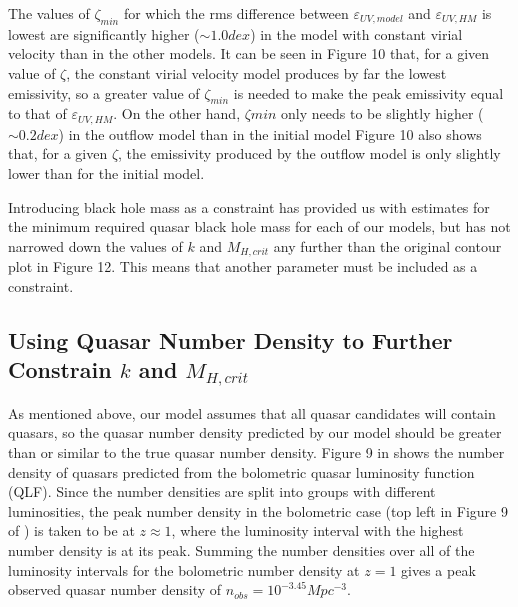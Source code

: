 \documentclass[12pt, twocolumn]{report}%
\begin{document}
The values of $\zeta_{min}$ for which the rms difference between $\varepsilon_{UV,model}$ and $\varepsilon_{UV,HM}$ is lowest are significantly higher ($\sim1.0dex$) in the model with constant virial velocity than in the other models. It can be seen in Figure 10 that, for a given value of $\zeta$, the constant virial velocity model produces by far the lowest emissivity, so a greater value of $\zeta_{min}$ is needed to make the peak emissivity equal to that of $\varepsilon_{UV,HM}$. On the other hand, $\zeta{min}$ only needs to be slightly higher ($\sim0.2dex$) in the outflow model than in the initial model Figure 10 also shows that, for a given $\zeta$, the emissivity produced by the outflow model is only slightly lower than for the initial model.\par

Introducing black hole mass as a constraint has provided us with estimates for the minimum required quasar black hole mass for each of our models, but has not narrowed down the values of $k$ and $M_{H,crit}$ any further than the original contour plot in Figure 12. This means that another parameter must be included as a constraint.

\subsection{Using Quasar Number Density to Further Constrain $k$ and $M_{H,crit}$}

As mentioned above, our model assumes that all quasar candidates will contain quasars, so the quasar number density predicted by our model should be greater than or similar to the true quasar number density. Figure 9 in \cite{Hopkins} shows the number density of quasars predicted from the bolometric quasar luminosity function (QLF). Since the number densities are split into groups with different luminosities, the peak number density in the bolometric case (top left in Figure 9 of \citeauthor{Hopkins}) is taken to be at $z\approx1$, where the luminosity interval with the highest number density is at its peak. Summing the number densities over all of the luminosity intervals for the bolometric number density at $z=1$ gives a peak observed quasar number density of $n_{obs}=10^{-3.45}Mpc^{-3}$.\par
\end{document}
